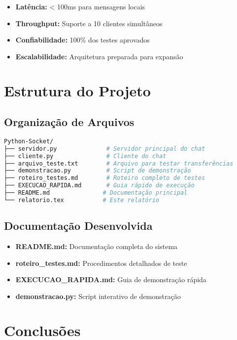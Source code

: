 \documentclass[12pt,a4paper]{article}
\begin{document}
\begin{itemize}
    \item \textbf{Latência:} < 100ms para mensagens locais
    \item \textbf{Throughput:} Suporte a 10 clientes simultâneos
    \item \textbf{Confiabilidade:} 100\% dos testes aprovados
    \item \textbf{Escalabilidade:} Arquitetura preparada para expansão
\end{itemize}

\section{Estrutura do Projeto}

\subsection{Organização de Arquivos}

\begin{lstlisting}[language=bash, caption=Estrutura de diretórios]
Python-Socket/
├── servidor.py              # Servidor principal do chat
├── cliente.py               # Cliente do chat
├── arquivo_teste.txt        # Arquivo para testar transferências
├── demonstracao.py          # Script de demonstração
├── roteiro_testes.md        # Roteiro completo de testes
├── EXECUCAO_RAPIDA.md       # Guia rápido de execução
├── README.md               # Documentação principal
└── relatorio.tex           # Este relatório
\end{lstlisting}

\subsection{Documentação Desenvolvida}

\begin{itemize}
    \item \textbf{README.md:} Documentação completa do sistema
    \item \textbf{roteiro\_testes.md:} Procedimentos detalhados de teste
    \item \textbf{EXECUCAO\_RAPIDA.md:} Guia de demonstração rápida
    \item \textbf{demonstracao.py:} Script interativo de demonstração
\end{itemize}

\section{Conclusões}
\end{document}
